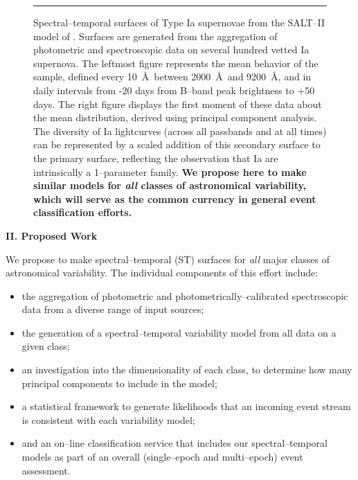 \begin{figure}[t]
\centerline{ \hfil
{}} \smallskip
\caption[]{\footnotesize Spectral--temporal surfaces of Type Ia supernovae from
the SALT--II model of \cite{2007A&A...466...11G}.  Surfaces are generated from
the aggregation of photometric and spectroscopic data on several hundred vetted
Ia supernova.  The leftmost figure represents the mean behavior of the sample,
defined every 10~\AA~between 2000~\AA~and 9200~\AA, and in daily intervals from
-20 days from B--band peak brightness to +50 days.  The right figure displays
the first moment of these data about the mean distribution, derived using
principal component analysis.  The diversity of Ia lightcurves (across all
passbands and at all times) can be represented by a scaled addition of this
secondary surface to the primary surface, reflecting the observation that Ia are
intrinsically a 1--parameter family.  {\bf We propose here to make similar
models for {\it all} classes of astronomical variability, which will serve as
the common currency in general event classification efforts.}} \medskip \hrule
\label{fig:salt2} \end{figure}

\bigskip \centerline{\bf II. Proposed Work} \smallskip

We propose to make spectral--temporal (ST) surfaces for {\it all} major classes
of astronomical variability.  The individual components of this effort include:

\begin{itemize}

\item the aggregation of photometric and photometrically--calibrated
spectroscopic data from a diverse range of input sources;

\item the generation of a spectral--temporal variability model from all data on
a given class;

\item an investigation into the dimensionality of each class, to determine how
many principal components to include in the model;

\item a statistical framework to generate likelihoods that an incoming event
stream is consistent with each variability model;

\item and an on--line classification service that includes our
spectral--temporal models as part of an overall (single--epoch and multi--epoch)
event assessment.

\end{itemize}


